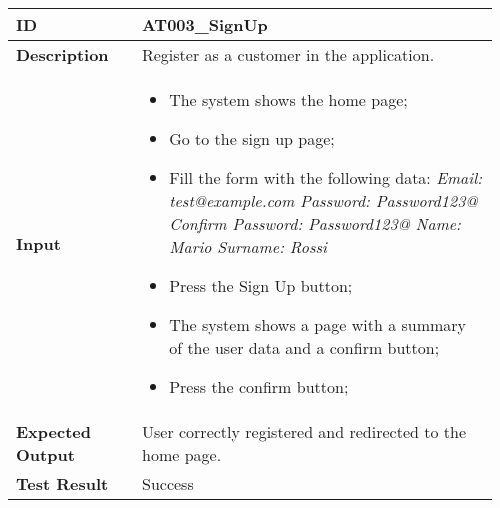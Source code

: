 \begin{table}[H]
	\centering
	\begin{tabular}{@{}p{0.25\linewidth}p{0.71\linewidth}@{}}
		\toprule
		\textbf{ID} & AT003\_SignUp \\
		\midrule
		\textbf{Description} & Register as a customer in the application. \\
		\midrule
		\textbf{Input} & \begin{itemize}[leftmargin=.4cm,noitemsep,topsep=0pt,before=\vspace{-3mm},after=\vspace{-4mm}]
			\item The system shows the home page;
			\item Go to the sign up page;
			\item Fill the form with the following data:\newline
			  \textit{Email: test@example.com\newline
			  Password: Password123@\newline
			  Confirm Password: Password123@\newline
			  Name: Mario\newline
			  Surname: Rossi}
			\item Press the Sign Up button;
			\item The system shows a page with a summary of the user data and a confirm button;
			\item Press the confirm button;
		\end{itemize}\\
		\midrule
		\textbf{Expected Output} & User correctly registered and redirected to the home page.\\
		\midrule
		\textbf{Test Result} & Success\\
		\bottomrule
	\end{tabular}
\end{table}

